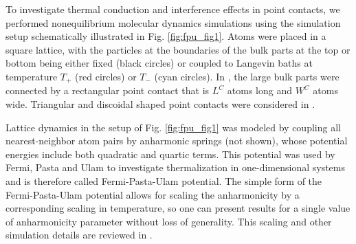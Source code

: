 To investigate thermal conduction and interference effects in point contacts, we performed nonequilibrium molecular dynamics simulations using the simulation setup schematically illustrated in Fig. \ref{fig:fpu_fig1}. Atoms were placed in a square lattice, with the particles at the boundaries of the bulk parts at the top or bottom being either fixed (black circles) or coupled to Langevin baths at temperature $T_+$ (red circles) or $T_-$ (cyan circles). In , the large bulk parts were connected by a rectangular point contact that is $L^C$ atoms long and $W^C$ atoms wide. Triangular and discoidal shaped point contacts were considered in . 

Lattice dynamics in the setup of Fig. \ref{fig:fpu_fig1} was modeled by coupling all nearest-neighbor atom pairs by anharmonic springs (not shown), whose potential energies include both quadratic and quartic terms. This potential was used by Fermi, Pasta and Ulam to investigate thermalization in one-dimensional systems \cite{fermi55} and is therefore called Fermi-Pasta-Ulam potential. The simple form of the Fermi-Pasta-Ulam potential allows for scaling the anharmonicity by a corresponding scaling in temperature, so one can present results for a single value of anharmonicity parameter without loss of generality. This scaling and other simulation details are reviewed in . 


